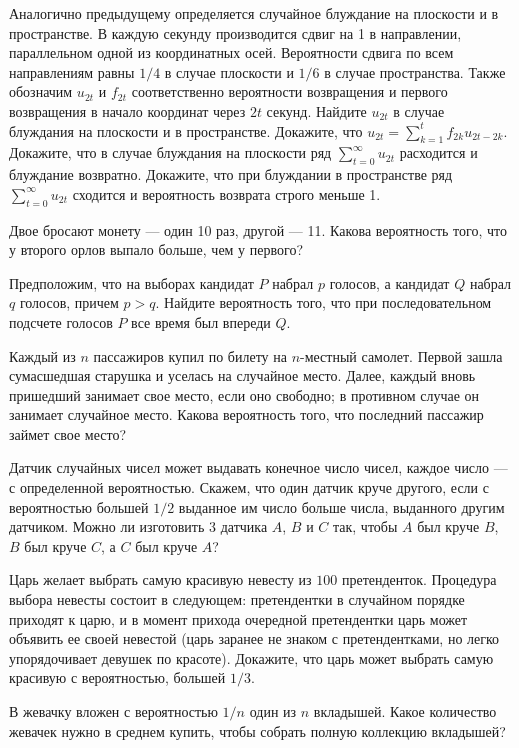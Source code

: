 \documentclass[a4paper,12pt]{article}
\begin{document}
Аналогично предыдущему определяется случайное блуждание на плоскости и в
пространстве. В каждую секунду производится сдвиг на 1 в  направлении,
параллельном одной из координатных осей. Вероятности сдвига по всем
направлениям равны $1/4$ в случае плоскости и $1/6$
в случае пространства. Также обозначим $u_{2t}$
и $f_{2t}$ соответственно вероятности возвращения и первого возвращения
в начало координат через $2t$ секунд.
 Найдите $u_{2t}$ в случае блуждания на плоскости и в пространстве.
 Докажите, что $u_{2t}=\sum\limits_{k=1}^{t} f_{2k}u_{2t-2k}$.
 Докажите, что в случае блуждания на плоскости   ряд
$\sum\limits_{t=0}^{\infty} u_{2t}$ расходится и блуждание возвратно.
 Докажите, что при блуждании в пространстве ряд
$\sum\limits_{t=0}^{\infty} u_{2t}$
сходится и вероятность возврата строго меньше 1.

\vspace*{-5mm}

Двое бросают монету --- один 10 раз, другой --- 11. Какова вероятность того,
что у второго орлов выпало больше, чем у первого?  

 Предположим, что на выборах кандидат
$P$ набрал $p$ голосов, а кандидат $Q$ набрал $q$ голосов, причем
$p>q$. Найдите вероятность того, что при последовательном подсчете голосов
$P$ все время был впереди $Q$.


Каждый из $n$ пассажиров купил по билету на $n$-местный самолет.
Первой зашла сумасшедшая старушка и уселась на случайное
место. Далее, каждый вновь пришедший занимает свое место, если оно свободно;
в противном случае он занимает случайное место. Какова вероятность того, что
последний пассажир займет свое место?

Датчик случайных чисел может выдавать конечное число чисел, каждое число ---
с определенной вероятностью. Скажем, что один датчик круче другого, если
с вероятностью большей $1/2$ выданное им число больше числа, выданного другим
датчиком. Можно ли изготовить 3 датчика $A$, $B$ и $C$ так, чтобы $A$
был круче $B$, $B$ был круче $C$, а $C$ был круче $A$?

Царь желает выбрать самую красивую невесту из $100$ претенденток.
Процедура выбора  невесты состоит в следующем: претендентки в случайном
порядке приходят к царю, и в момент прихода очередной претендентки
 царь может объявить
ее своей невестой (царь заранее не знаком с претендентками, но легко
упорядочивает девушек по красоте). Докажите, что царь может выбрать самую
красивую с вероятностью, большей $1/3$.

В жевачку вложен с вероятностью $1/n$ один из $n$ вкладышей. Какое количество
жевачек нужно в среднем купить, чтобы собрать полную коллекцию вкладышей?



\end{document}
